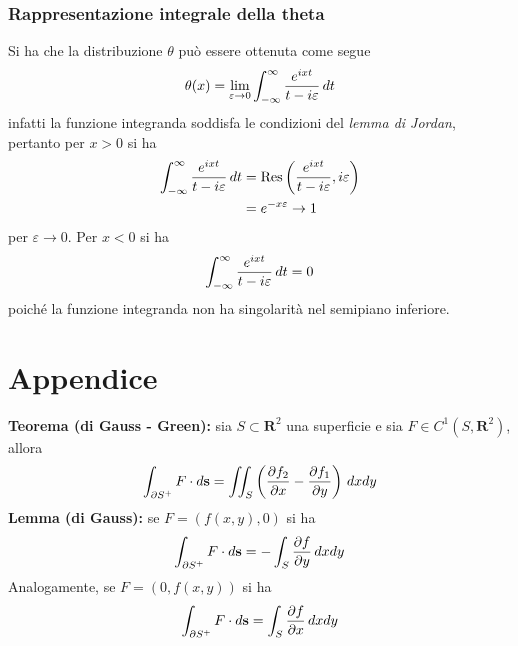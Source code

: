 \documentclass{article}
\begin{document}
\subsubsection{Rappresentazione integrale della theta}
Si ha che la distribuzione $\theta$ può essere ottenuta come segue
\begin{gather}
    \theta(x) = \lim_{\varepsilon \rightarrow 0}\int_{-\infty}^\infty \frac{e^{ixt}}{t - i\varepsilon} \, dt \notag
\end{gather}
infatti la funzione integranda soddisfa le condizioni del \textit{lemma di Jordan}, pertanto per $x > 0$ si ha
\begin{align}
    \int_{-\infty}^\infty \frac{e^{ixt}}{t - i\varepsilon} \, dt &= \mathrm{Res}\left(\frac{e^{ixt}}{t - i\varepsilon}, i\varepsilon\right) \notag \\
    &= e^{-x\varepsilon} \rightarrow 1 \notag
\end{align}
per $\varepsilon \rightarrow 0$. Per $x < 0$ si ha
\begin{gather}
    \int_{-\infty}^\infty \frac{e^{ixt}}{t - i\varepsilon} \, dt = 0 \notag
\end{gather}
poiché la funzione integranda non ha singolarità nel semipiano inferiore.

\newpage
\section*{Appendice}
\textbf{Teorema (di Gauss - Green):} sia $S \subset \mathbf{R}^2$ una superficie e sia $F \in C^1(S, \mathbf{R}^2)$, allora
\begin{gather}
    \int_{\partial S^+}F \cdot d\mathbf{s} = \iint_{S}\left(\frac{\partial f_2}{\partial x} - \frac{\partial f_1}{\partial y}\right) \, dxdy \notag
\end{gather}
\textbf{Lemma (di Gauss):} se $F = (f(x, y), 0)$ si ha
\begin{gather}
    \int_{\partial S^+}F \cdot d\mathbf{s} = -\int_S \frac{\partial f}{\partial y} \, dxdy \notag
\end{gather}
Analogamente, se $F = (0, f(x, y))$ si ha
\begin{gather}
    \int_{\partial S^+}F \cdot d\mathbf{s} = \int_S \frac{\partial f}{\partial x} \, dxdy \notag
\end{gather}
 
\end{document}
